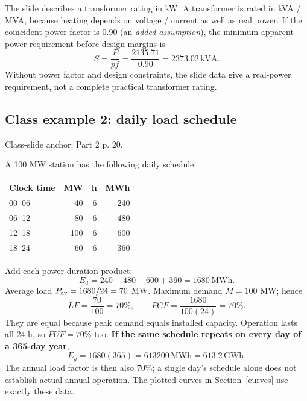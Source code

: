 \documentclass[11pt,a4paper]{article}
\newenvironment{Caution}[1]{\begin{tcolorbox}[colback=warm,colframe=rust,coltitle=white,title={#1}]}{\end{tcolorbox}}
\newcommand{\slides}[1]{{\small\color{muted}\textsf{Class-slide anchor: #1.}}\par}
\begin{document}
\begin{Caution}{Transformer correction}
The slide describes a transformer rating in kW. A transformer is rated in kVA / MVA, because heating depends on voltage / current as well as real power. If the coincident power factor is 0.90 (an \emph{added assumption}), the minimum apparent-power requirement before design margins is
\[
S=\frac{P}{pf}=\frac{2135.71}{0.90}=2373.02\,\mathrm{kVA}.
\]
Without power factor and design constraints, the slide data give a real-power requirement, not a complete practical transformer rating.
\end{Caution}

\subsection{Class example 2: daily load schedule}
\slides{Part 2 p. 20}
A 100 MW station has the following daily schedule:
\begin{center}\small
\begin{tabular}{lrrr}\toprule
\textbf{Clock time} & \textbf{MW} & \textbf{h} & \textbf{MWh}\\\midrule
00--06 &40&6&240\\06--12&80&6&480\\12--18&100&6&600\\18--24&60&6&360\\\bottomrule
\end{tabular}\end{center}
Add each power-duration product:
\[
E_d=240+480+600+360=\boxed{1680\,\mathrm{MWh}}.
\]
Average load $P_{\rm av}=1680/24=70$ MW. Maximum demand $M=100$ MW; hence
\[
LF=\frac{70}{100}=\boxed{70\%},\qquad
PCF=\frac{1680}{100(24)}=\boxed{70\%}.
\]
They are equal because peak demand equals installed capacity. Operation lasts all 24 h, so $PUF=70\%$ too. \textbf{If the same schedule repeats on every day of a 365-day year},
\[
E_y=1680(365)=\boxed{613200\,\mathrm{MWh}}=613.2\,\mathrm{GWh}.
\]
The annual load factor is then also 70\%; a single day's schedule alone does not establish actual annual operation. The plotted curves in Section~\ref{curves} use exactly these data.
\end{document}

